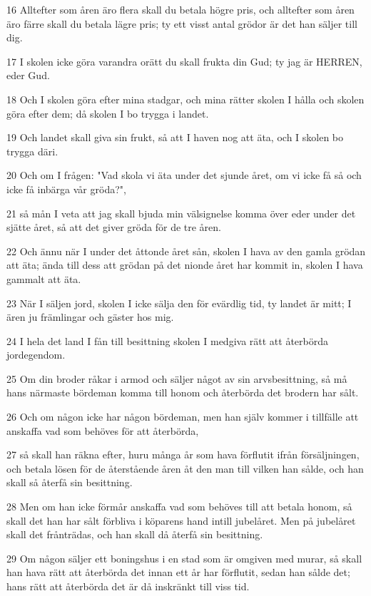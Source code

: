 \par 16 Alltefter som åren äro flera skall du betala högre pris, och alltefter som åren äro färre skall du betala lägre pris; ty ett visst antal grödor är det han säljer till dig.
\par 17 I skolen icke göra varandra orätt du skall frukta din Gud; ty jag är HERREN, eder Gud.
\par 18 Och I skolen göra efter mina stadgar, och mina rätter skolen I hålla och skolen göra efter dem; då skolen I bo trygga i landet.
\par 19 Och landet skall giva sin frukt, så att I haven nog att äta, och I skolen bo trygga däri.
\par 20 Och om I frågen: "Vad skola vi äta under det sjunde året, om vi icke få så och icke få inbärga vår gröda?",
\par 21 så mån I veta att jag skall bjuda min välsignelse komma över eder under det sjätte året, så att det giver gröda för de tre åren.
\par 22 Och ännu när I under det åttonde året sån, skolen I hava av den gamla grödan att äta; ända till dess att grödan på det nionde året har kommit in, skolen I hava gammalt att äta.
\par 23 När I säljen jord, skolen I icke sälja den för evärdlig tid, ty landet är mitt; I ären ju främlingar och gäster hos mig.
\par 24 I hela det land I fån till besittning skolen I medgiva rätt att återbörda jordegendom.
\par 25 Om din broder råkar i armod och säljer något av sin arvsbesittning, så må hans närmaste bördeman komma till honom och återbörda det brodern har sålt.
\par 26 Och om någon icke har någon bördeman, men han själv kommer i tillfälle att anskaffa vad som behöves för att återbörda,
\par 27 så skall han räkna efter, huru många år som hava förflutit ifrån försäljningen, och betala lösen för de återstående åren åt den man till vilken han sålde, och han skall så återfå sin besittning.
\par 28 Men om han icke förmår anskaffa vad som behöves till att betala honom, så skall det han har sålt förbliva i köparens hand intill jubelåret. Men på jubelåret skall det frånträdas, och han skall då återfå sin besittning.
\par 29 Om någon säljer ett boningshus i en stad som är omgiven med murar, så skall han hava rätt att återbörda det innan ett år har förflutit, sedan han sålde det; hans rätt att återbörda det är då inskränkt till viss tid.
